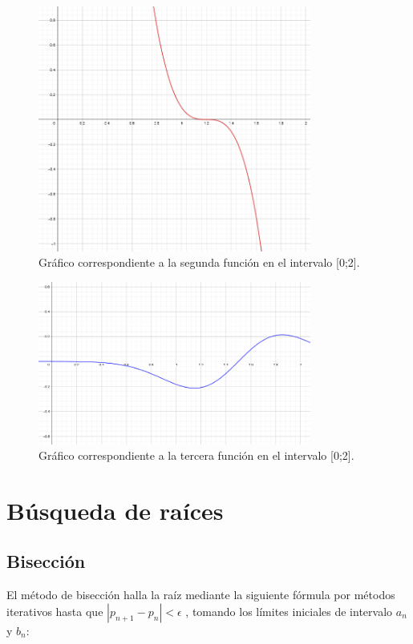 \documentclass[titlepage,a4paper]{article}
\begin{document}
\begin{figure}[H]
    \centering
    \includegraphics[width=0.8\textwidth]{funcion2.png}
    \caption{\label{fig:f2}Gráfico correspondiente a la segunda función en el intervalo [0;2].}
\end{figure}

\begin{figure}[H]
    \centering
    \includegraphics[width=0.8\textwidth]{funcion3.png}
    \caption{\label{fig:f3}Gráfico correspondiente a la tercera función en el intervalo [0;2].}
\end{figure}

\section{Búsqueda de raíces}\label{sec:busqueda_raices}

\subsection{Bisección}\label{sec:biseccion}
El método de bisección halla la raíz mediante la siguiente fórmula por métodos iterativos hasta que 
$ |p_{n+1} - p_{n}| < \mbox{$\epsilon$} $ , tomando los límites iniciales de intervalo ${a_n}$ y ${b_n}$:
\end{document}
